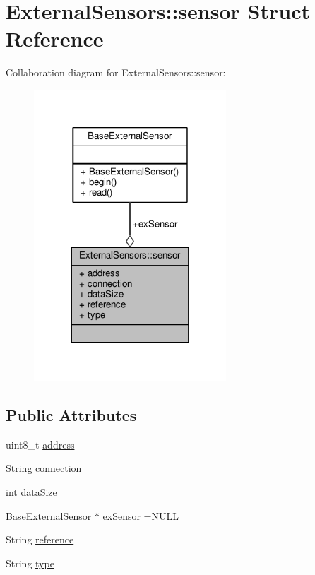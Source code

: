 \hypertarget{structExternalSensors_1_1sensor}{}\section{External\+Sensors\+:\+:sensor Struct Reference}
\label{structExternalSensors_1_1sensor}


Collaboration diagram for External\+Sensors\+:\+:sensor\+:
\nopagebreak
\begin{figure}[H]
\begin{center}
\leavevmode
\includegraphics[width=204pt]{structExternalSensors_1_1sensor__coll__graph}
\end{center}
\end{figure}
\subsection*{Public Attributes}
\begin{DoxyCompactItemize}
\item 
uint8\+\_\+t \hyperlink{structExternalSensors_1_1sensor_a8d70ca58524521ed054fc6b81eb58d34}{address}
\item 
String \hyperlink{structExternalSensors_1_1sensor_ae3c8c1da809f2238bc9abde37a6c6022}{connection}
\item 
int \hyperlink{structExternalSensors_1_1sensor_ae9c669bb93befbe4b333920e7f357b80}{data\+Size}
\item 
\hyperlink{classBaseExternalSensor}{Base\+External\+Sensor} $\ast$ \hyperlink{structExternalSensors_1_1sensor_a9bca150fd468b8d0e090e6d72c5c2b48}{ex\+Sensor} =N\+U\+LL
\item 
String \hyperlink{structExternalSensors_1_1sensor_afed5bdfd49732202a368b600cb8396fe}{reference}
\item 
String \hyperlink{structExternalSensors_1_1sensor_a6acfdb02c742c2110d7bd2b5d9fce9e7}{type}
\end{DoxyCompactItemize}


